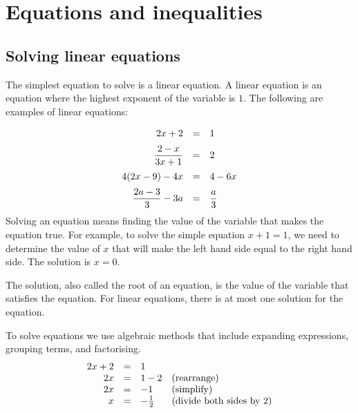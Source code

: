 \chapter{Equations and inequalities}
\setcounter{figure}{1}
\setcounter{subfigure}{1}

\section{Solving linear equations}
         
The simplest equation to solve is a linear equation. A linear equation is an
equation where the highest exponent of the variable is $1$. The
following are examples of linear equations:\par 


\begin{equation*}
\begin{array}{ccl}\hfill 2x+2& =& 1\hfill \vspace{6pt} \\
 \hfill \dfrac{2-x}{3x+1}& =& 2\hfill \vspace{6pt} \\
\hfill 4(2x-9)-4x&=&4-6x \hfill  \vspace{6pt}\\ 
\hfill \dfrac{2a-3}{3}-3a&=&\dfrac{a}{3} \hfill\\
\end{array}
\end{equation*}
Solving an equation means finding the value of the variable that makes
the equation true. For example, to solve the simple equation $x+1=1$, we need to determine the value of $x$ that will make the left hand side equal to the right hand side. The solution is $x=0$.\par 
The solution, also called the root of an equation, is the value of the variable that satisfies the equation.
For linear equations, there is at most one solution for the equation.\par 
To solve equations we use algebraic methods that include expanding expressions, grouping terms, and factorising.
\begin{equation*}
  \begin{array}{ccll}\hfill 2x+2& =& 1\hfill \\ 
      \hfill 2x& =& 1-2\hfill & \mbox{(rearrange)}\hfill \\ 
      \hfill 2x& =& -1\hfill & \mbox{(simplify)}\hfill \\
\hfill x&=& -\frac{1}{2} & \mbox{(divide both sides by $2$)} \hfill
  \end{array}
\end{equation*}

